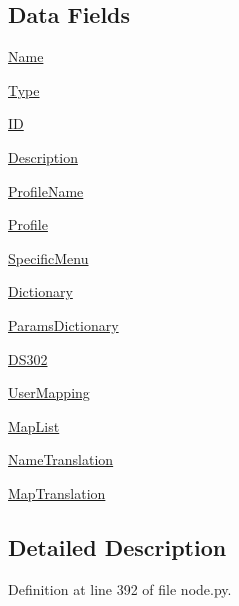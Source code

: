 \subsection*{Data Fields}
\begin{CompactItemize}
\item 
\hyperlink{classnode_1_1Node_b5fcb10e9efa5cebbd8a1b001ef0e936}{Name}
\item 
\hyperlink{classnode_1_1Node_c0cf6b14fa5a80a5e19c4a2fd89a49ab}{Type}
\item 
\hyperlink{classnode_1_1Node_a2e2c00f6b8eb25f09b4fce1878fb489}{ID}
\item 
\hyperlink{classnode_1_1Node_877b512bfd8ceefecb5bc4a8355e01f0}{Description}
\item 
\hyperlink{classnode_1_1Node_5d68a061e243ecb463d2e1afb3b5f94c}{Profile\-Name}
\item 
\hyperlink{classnode_1_1Node_409e3e267a8642dd6e5373a9f208c006}{Profile}
\item 
\hyperlink{classnode_1_1Node_4bac6f808a5c987186dbbe27c165ba1d}{Specific\-Menu}
\item 
\hyperlink{classnode_1_1Node_a9020327cb63760fb0187ecda0663155}{Dictionary}
\item 
\hyperlink{classnode_1_1Node_3ae67c880acfbebf42e40a48d7b57798}{Params\-Dictionary}
\item 
\hyperlink{classnode_1_1Node_069e8473246460ebcc4df174a23166b4}{DS302}
\item 
\hyperlink{classnode_1_1Node_b38477c46c04b9ab47ed87c56b3e0708}{User\-Mapping}
\item 
\hyperlink{classnode_1_1Node_45eaa0ecb0f1d86339a6674faf1535b9}{Map\-List}
\item 
\hyperlink{classnode_1_1Node_f00e144081c08560aa31f6094bc1f260}{Name\-Translation}
\item 
\hyperlink{classnode_1_1Node_a6b1b71fc6b6f9d52f142a808fa724a6}{Map\-Translation}
\end{CompactItemize}


\subsection{Detailed Description}




Definition at line 392 of file node.py.

